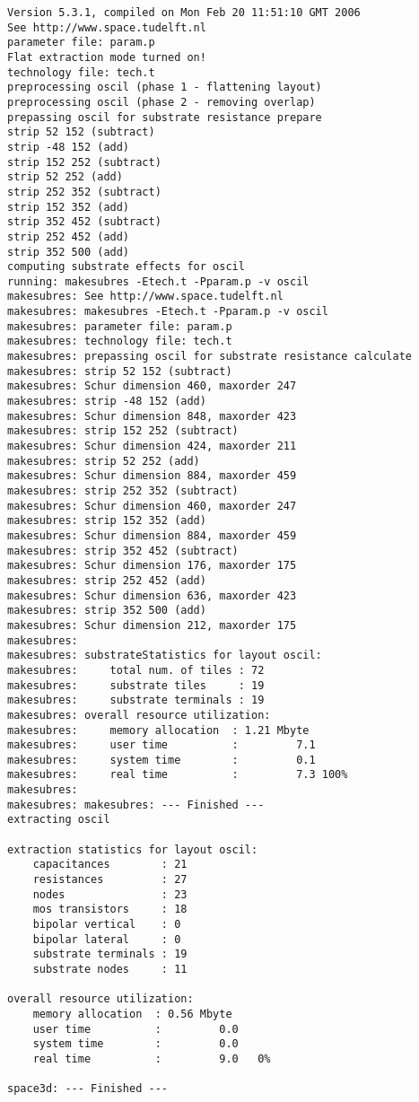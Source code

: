 \small \begin{Verbatim}[frame=single]
Version 5.3.1, compiled on Mon Feb 20 11:51:10 GMT 2006
See http://www.space.tudelft.nl
parameter file: param.p
Flat extraction mode turned on!
technology file: tech.t
preprocessing oscil (phase 1 - flattening layout)
preprocessing oscil (phase 2 - removing overlap)
prepassing oscil for substrate resistance prepare
strip 52 152 (subtract)
strip -48 152 (add)
strip 152 252 (subtract)
strip 52 252 (add)
strip 252 352 (subtract)
strip 152 352 (add)
strip 352 452 (subtract)
strip 252 452 (add)
strip 352 500 (add)
computing substrate effects for oscil
running: makesubres -Etech.t -Pparam.p -v oscil
makesubres: See http://www.space.tudelft.nl
makesubres: makesubres -Etech.t -Pparam.p -v oscil
makesubres: parameter file: param.p
makesubres: technology file: tech.t
makesubres: prepassing oscil for substrate resistance calculate
makesubres: strip 52 152 (subtract)
makesubres: Schur dimension 460, maxorder 247
makesubres: strip -48 152 (add)
makesubres: Schur dimension 848, maxorder 423
makesubres: strip 152 252 (subtract)
makesubres: Schur dimension 424, maxorder 211
makesubres: strip 52 252 (add)
makesubres: Schur dimension 884, maxorder 459
makesubres: strip 252 352 (subtract)
makesubres: Schur dimension 460, maxorder 247
makesubres: strip 152 352 (add)
makesubres: Schur dimension 884, maxorder 459
makesubres: strip 352 452 (subtract)
makesubres: Schur dimension 176, maxorder 175
makesubres: strip 252 452 (add)
makesubres: Schur dimension 636, maxorder 423
makesubres: strip 352 500 (add)
makesubres: Schur dimension 212, maxorder 175
makesubres:
makesubres: substrateStatistics for layout oscil:
makesubres: 	total num. of tiles : 72
makesubres: 	substrate tiles     : 19
makesubres: 	substrate terminals : 19
makesubres: overall resource utilization:
makesubres: 	memory allocation  : 1.21 Mbyte
makesubres: 	user time          :         7.1
makesubres: 	system time        :         0.1
makesubres: 	real time          :         7.3 100%
makesubres:
makesubres: makesubres: --- Finished ---
extracting oscil

extraction statistics for layout oscil:
	capacitances        : 21
	resistances         : 27
	nodes               : 23
	mos transistors     : 18
	bipolar vertical    : 0
	bipolar lateral     : 0
	substrate terminals : 19
	substrate nodes     : 11

overall resource utilization:
	memory allocation  : 0.56 Mbyte
	user time          :         0.0
	system time        :         0.0
	real time          :         9.0   0%

space3d: --- Finished ---
\end{Verbatim}
